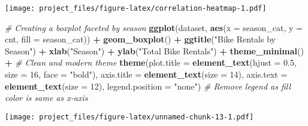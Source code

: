 \documentclass[
]{article}
\newenvironment{Shaded}{\begin{snugshade}}{\end{snugshade}}
\newcommand{\AttributeTok}[1]{\textcolor[rgb]{0.13,0.29,0.53}{#1}}
\newcommand{\CommentTok}[1]{\textcolor[rgb]{0.56,0.35,0.01}{\textit{#1}}}
\newcommand{\DecValTok}[1]{\textcolor[rgb]{0.00,0.00,0.81}{#1}}
\newcommand{\FloatTok}[1]{\textcolor[rgb]{0.00,0.00,0.81}{#1}}
\newcommand{\FunctionTok}[1]{\textcolor[rgb]{0.13,0.29,0.53}{\textbf{#1}}}
\newcommand{\NormalTok}[1]{#1}
\newcommand{\SpecialCharTok}[1]{\textcolor[rgb]{0.81,0.36,0.00}{\textbf{#1}}}
\newcommand{\StringTok}[1]{\textcolor[rgb]{0.31,0.60,0.02}{#1}}
\begin{document}
\texttt{[image: project\_files/figure-latex/correlation-heatmap-1.pdf]}

\begin{Shaded}
\begin{Highlighting}[]
\CommentTok{\# Creating a boxplot faceted by season}
\FunctionTok{ggplot}\NormalTok{(dataset, }\FunctionTok{aes}\NormalTok{(}\AttributeTok{x =}\NormalTok{ season\_cat, }\AttributeTok{y =}\NormalTok{ cnt, }\AttributeTok{fill =}\NormalTok{ season\_cat)) }\SpecialCharTok{+} 
    \FunctionTok{geom\_boxplot}\NormalTok{() }\SpecialCharTok{+} 
    \FunctionTok{ggtitle}\NormalTok{(}\StringTok{"Bike Rentals by Season"}\NormalTok{) }\SpecialCharTok{+}
    \FunctionTok{xlab}\NormalTok{(}\StringTok{"Season"}\NormalTok{) }\SpecialCharTok{+}
    \FunctionTok{ylab}\NormalTok{(}\StringTok{"Total Bike Rentals"}\NormalTok{) }\SpecialCharTok{+}
    \FunctionTok{theme\_minimal}\NormalTok{() }\SpecialCharTok{+}  \CommentTok{\# Clean and modern theme}
    \FunctionTok{theme}\NormalTok{(}\AttributeTok{plot.title =} \FunctionTok{element\_text}\NormalTok{(}\AttributeTok{hjust =} \FloatTok{0.5}\NormalTok{, }\AttributeTok{size =} \DecValTok{16}\NormalTok{, }\AttributeTok{face =} \StringTok{"bold"}\NormalTok{),}
          \AttributeTok{axis.title =} \FunctionTok{element\_text}\NormalTok{(}\AttributeTok{size =} \DecValTok{14}\NormalTok{),}
          \AttributeTok{axis.text =} \FunctionTok{element\_text}\NormalTok{(}\AttributeTok{size =} \DecValTok{12}\NormalTok{),}
          \AttributeTok{legend.position =} \StringTok{"none"}\NormalTok{)  }\CommentTok{\# Remove legend as fill color is same as x{-}axis}
\end{Highlighting}
\end{Shaded}

\texttt{[image: project\_files/figure-latex/unnamed-chunk-13-1.pdf]}
\end{document}
